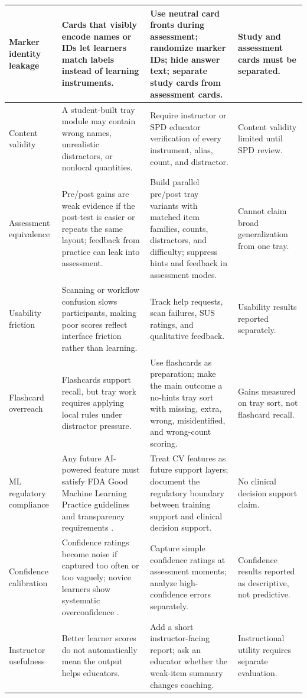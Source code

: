 \documentclass[10pt,a4paper]{article}
\begin{document}
\begin{table}[!htb]
\begin{tabularx}{\textwidth}{|>{\raggedright\arraybackslash}p{2.4cm}|>{\raggedright\arraybackslash}X|>{\raggedright\arraybackslash}X|>{\raggedright\arraybackslash}p{2.3cm}|}
\hline
Marker identity leakage & Cards that visibly encode names or IDs let learners match labels instead of learning instruments. & Use neutral card fronts during assessment; randomize marker IDs; hide answer text; separate study cards from assessment cards. & Study and assessment cards must be separated. \\
\hline
Content validity & A student-built tray module may contain wrong names, unrealistic distractors, or nonlocal quantities. & Require instructor or SPD educator verification of every instrument, alias, count, and distractor. & Content validity limited until SPD review. \\
\hline
Assessment equivalence & Pre/post gains are weak evidence if the post-test is easier or repeats the same layout; feedback from practice can leak into assessment. & Build parallel pre/post tray variants with matched item families, counts, distractors, and difficulty; suppress hints and feedback in assessment modes. & Cannot claim broad generalization from one tray. \\
\hline
Usability friction & Scanning or workflow confusion slows participants, making poor scores reflect interface friction rather than learning. & Track help requests, scan failures, SUS ratings, and qualitative feedback. & Usability results reported separately. \\
\hline
Flashcard overreach & Flashcards support recall, but tray work requires applying local rules under distractor pressure. & Use flashcards as preparation; make the main outcome a no-hints tray sort with missing, extra, wrong, misidentified, and wrong-count scoring. & Gains measured on tray sort, not flashcard recall. \\
\hline
ML regulatory compliance & Any future AI-powered feature must satisfy FDA Good Machine Learning Practice guidelines and transparency requirements \cite{fda-gmlp-accessed-2026, fda-transparency-accessed-2026}. & Treat CV features as future support layers; document the regulatory boundary between training support and clinical decision support. & No clinical decision support claim. \\
\hline
Confidence calibration & Confidence ratings become noise if captured too often or too vaguely; novice learners show systematic overconfidence \cite{kruger-dunning-1999}. & Capture simple confidence ratings at assessment moments; analyze high-confidence errors separately. & Confidence results reported as descriptive, not predictive. \\
\hline
Instructor usefulness & Better learner scores do not automatically mean the output helps educators. & Add a short instructor-facing report; ask an educator whether the weak-item summary changes coaching. & Instructional utility requires separate evaluation. \\
\hline
\end{tabularx}
\end{table}
\end{document}
